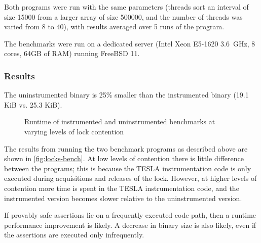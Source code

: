 Both programs were run with the same parameters (threads sort an
interval of size \num{15000} from a larger array of size \num{500000},
and the number of threads was varied from 8 to 40), with results
averaged over 5 runs of the program.

The benchmarks were run on a dedicated server (Intel Xeon E5-1620
\SI{3.6}{\GHz}, 8 cores, 64GB of RAM) running FreeBSD 11.

\subsubsection{Results}

The uninstrumented binary is 25\% smaller than the instrumented binary
(\num{19.1} KiB vs. \num{25.3} KiB).

\begin{figure}[ht]
  \centering
  \caption{Runtime of instrumented and uninstrumented benchmarks at
  varying levels of lock contention}
  \label{fig:locks-bench}
\end{figure}

The results from running the two benchmark programs as described above
are shown in \autoref{fig:locks-bench}. At low levels of contention
there is little difference between the programs; this is because the
TESLA instrumentation code is only executed during acquisitions and
releases of the lock. However, at higher levels of contention more time
is spent in the TESLA instrumentation code, and the instrumented version
becomes slower relative to the uninstrumented version.

If provably safe assertions lie on a frequently executed code path, then
a runtime performance improvement is likely. A decrease in binary size
is also likely, even if the assertions are executed only infrequently.

